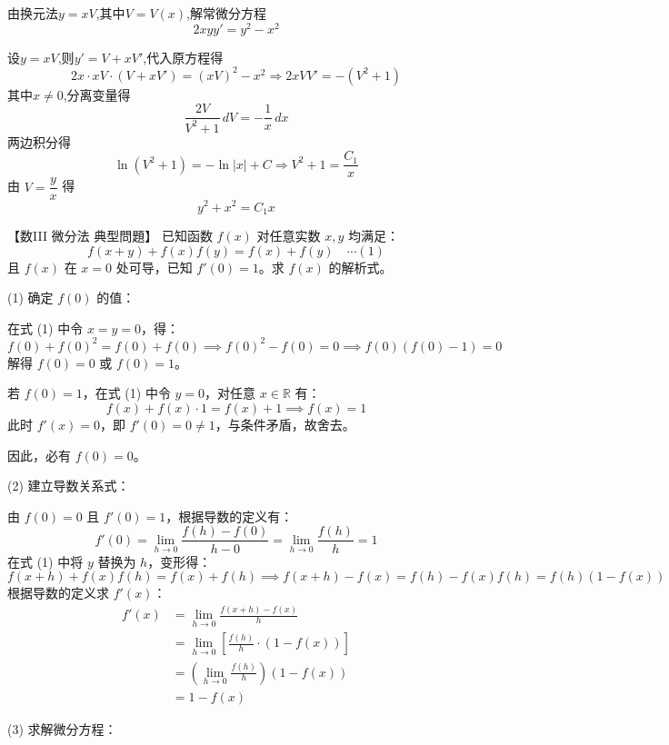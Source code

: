 \begin{questions}
    \question 由换元法$y=xV$,其中$V=V(x)$,解常微分方程 
    \[ 
    2xyy' = y^2 - x^2
    \]
    \begin{solution}
        设$y=xV$,则$y' = V + xV'$,代入原方程得
        \[
        2x\cdot xV\cdot (V + xV') = (xV)^2 - x^2 \Rightarrow 2xVV' = -(V^2 + 1)
        \]
        其中$x\neq0$,分离变量得
        \[
        \frac{2V}{V^2+1}\,dV = -\frac{1}{x}\,dx
        \]
        两边积分得
        \[
        \ln(V^2+1) = -\ln|x| + C \Rightarrow V^2+1 = \frac{C_1}{x}
        \]
        由 $V=\dfrac{y}{x}$ 得
        \[
        y^2 + x^2 = C_1x
        \]
    \end{solution}

    \question
【数III 微分法 典型問題】
已知函数 $f(x)$ 对任意实数 $x, y$ 均满足：
\[
f(x+y) + f(x)f(y) = f(x) + f(y) \quad \cdots (1)
\]
且 $f(x)$ 在 $x = 0$ 处可导，已知 $f'(0) = 1$。求 $f(x)$ 的解析式。

\begin{solution}
(1) 确定 $f(0)$ 的值：

在式 (1) 中令 $x = y = 0$，得：
\[
f(0) + f(0)^2 = f(0) + f(0) \implies f(0)^2 - f(0) = 0 \implies f(0)(f(0) - 1) = 0
\]
解得 $f(0) = 0$ 或 $f(0) = 1$。

若 $f(0) = 1$，在式 (1) 中令 $y = 0$，对任意 $x \in \mathbb{R}$ 有：
\[
f(x) + f(x) \cdot 1 = f(x) + 1 \implies f(x) = 1
\]
此时 $f'(x) = 0$，即 $f'(0) = 0 \neq 1$，与条件矛盾，故舍去。

因此，必有 $f(0) = 0$。

\vspace{1em}

(2) 建立导数关系式：

由 $f(0) = 0$ 且 $f'(0) = 1$，根据导数的定义有：
\[
f'(0) = \lim_{h \to 0} \frac{f(h) - f(0)}{h - 0} = \lim_{h \to 0} \frac{f(h)}{h} = 1
\]
在式 (1) 中将 $y$ 替换为 $h$，变形得：
\[
f(x+h) + f(x)f(h) = f(x) + f(h) \implies f(x+h) - f(x) = f(h) - f(x)f(h) = f(h)(1 - f(x))
\]
根据导数的定义求 $f'(x)$：
\begin{align*}
f'(x) &= \lim_{h \to 0} \frac{f(x+h) - f(x)}{h} \\
&= \lim_{h \to 0} \left[ \frac{f(h)}{h} \cdot (1 - f(x)) \right] \\
&= \left( \lim_{h \to 0} \frac{f(h)}{h} \right) (1 - f(x)) \\
&= 1 - f(x)
\end{align*}

\vspace{1em}

(3) 求解微分方程：


\end{solution}
\end{questions}
